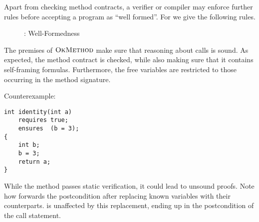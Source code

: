 Apart from checking method contracts, a verifier or compiler may enforce further rules before accepting a program as “well formed”.
For \svlidf we give the following rules.

\begin{figure}[h]
    
    \caption{\svlidf: Well-Formedness}
    \label{fig:idf-wf}
\end{figure}

The premises of $\textup{\textsc{OkMethod}}$ make sure that reasoning about calls is sound.
As expected, the method contract is checked, while also making sure that it contains self-framing formulas.
Furthermore, the free variables are restricted to those occurring in the method signature.

Counterexample:
\begin{lstlisting}
int identity(int a)
    requires true;
    ensures  (b = 3);
{
    int b;
    b = 3;
    return a;
}
\end{lstlisting}
While the method passes static verification, it could lead to unsound proofs.
Note how  forwards the postcondition after replacing known variables with their counterparts.
 is unaffected by this replacement, ending up in the postcondition of the call statement.
